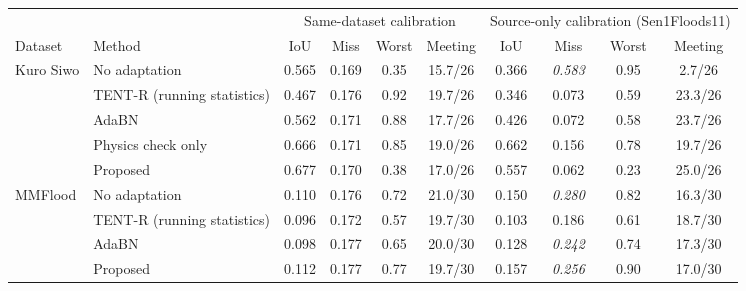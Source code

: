\begin{tabular}{llcccccccc}
\toprule
 & & \multicolumn{4}{c}{Same-dataset calibration} & \multicolumn{4}{c}{Source-only calibration (Sen1Floods11)} \\
\cmidrule(lr){3-6}\cmidrule(lr){7-10}
Dataset & Method & IoU & Miss & Worst & Meeting & IoU & Miss & Worst & Meeting \\
\midrule
Kuro Siwo & No adaptation & 0.565 & 0.169 & 0.35 & 15.7/26 & 0.366 & \textit{0.583} & 0.95 & 2.7/26 \\
 & TENT-R (running statistics) & 0.467 & 0.176 & 0.92 & 19.7/26 & 0.346 & 0.073 & 0.59 & 23.3/26 \\
 & AdaBN & 0.562 & 0.171 & 0.88 & 17.7/26 & 0.426 & 0.072 & 0.58 & 23.7/26 \\
 & Physics check only & 0.666 & 0.171 & 0.85 & 19.0/26 & 0.662 & 0.156 & 0.78 & 19.7/26 \\
 & Proposed & 0.677 & 0.170 & 0.38 & 17.0/26 & 0.557 & 0.062 & 0.23 & 25.0/26 \\
\midrule
MMFlood & No adaptation & 0.110 & 0.176 & 0.72 & 21.0/30 & 0.150 & \textit{0.280} & 0.82 & 16.3/30 \\
 & TENT-R (running statistics) & 0.096 & 0.172 & 0.57 & 19.7/30 & 0.103 & 0.186 & 0.61 & 18.7/30 \\
 & AdaBN & 0.098 & 0.177 & 0.65 & 20.0/30 & 0.128 & \textit{0.242} & 0.74 & 17.3/30 \\
 & Proposed & 0.112 & 0.177 & 0.77 & 19.7/30 & 0.157 & \textit{0.256} & 0.90 & 17.0/30 \\
\bottomrule
\end{tabular}
